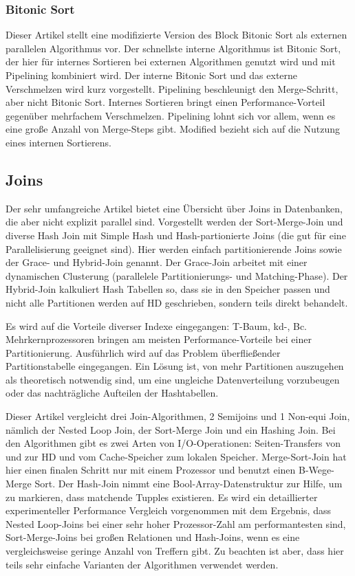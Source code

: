\documentclass[a4paper,12pt,twoside]{article}
\begin{document}
\subsubsection{Bitonic Sort}
\textbf{}

Dieser Artikel stellt eine modifizierte Version des Block Bitonic Sort als externen parallelen Algorithmus vor. Der schnellste interne Algorithmus ist Bitonic Sort, der hier für internes Sortieren bei externen Algorithmen genutzt wird und mit Pipelining kombiniert wird. Der interne Bitonic Sort und das externe Verschmelzen wird kurz vorgestellt. Pipelining beschleunigt den Merge-Schritt, aber nicht Bitonic Sort. Internes Sortieren bringt einen Performance-Vorteil gegenüber mehrfachem Verschmelzen. Pipelining lohnt sich vor allem, wenn es eine große Anzahl von Merge-Steps gibt. Modified bezieht sich auf die Nutzung eines internen Sortierens. 

\subsection{Joins}
\textbf{}

Der sehr umfangreiche Artikel bietet eine Übersicht über Joins in Datenbanken, die aber nicht explizit parallel sind. Vorgestellt werden der Sort-Merge-Join und diverse Hash Join mit Simple Hash und Hash-partionierte Joins (die gut für eine Parallelisierung geeignet sind). Hier werden einfach partitionierende Joins sowie der Grace- und Hybrid-Join genannt. Der Grace-Join arbeitet mit einer dynamischen Clusterung (parallelele Partitionierungs- und Matching-Phase). Der Hybrid-Join kalkuliert Hash Tabellen so, dass sie in den Speicher passen und nicht alle Partitionen werden auf HD geschrieben, sondern teils direkt behandelt.

Es wird auf die Vorteile diverser Indexe eingegangen: T-Baum, kd-, Bc. Mehrkernprozessoren bringen am meisten Performance-Vorteile bei einer Partitionierung. Ausführlich wird auf das Problem überfließender Partitionstabelle eingegangen. Ein Lösung ist, von mehr Partitionen auszugehen als theoretisch notwendig sind, um eine ungleiche Datenverteilung vorzubeugen oder das nachträgliche Aufteilen der Hashtabellen.

\textbf{}

Dieser Artikel vergleicht drei Join-Algorithmen, 2 Semijoins und 1 Non-equi Join, nämlich der Nested Loop Join, der Sort-Merge Join und ein Hashing Join. Bei den Algorithmen gibt es zwei Arten von I/O-Operationen: Seiten-Transfers von und zur HD und vom Cache-Speicher zum lokalen Speicher. Merge-Sort-Join hat hier einen finalen Schritt nur mit einem Prozessor und benutzt einen B-Wege-Merge Sort. Der Hash-Join nimmt eine Bool-Array-Datenstruktur zur Hilfe, um zu markieren, dass matchende Tupples existieren. Es wird ein detaillierter experimenteller Performance Vergleich vorgenommen mit dem Ergebnis, dass Nested Loop-Joins bei einer sehr hoher Prozessor-Zahl am performantesten sind, Sort-Merge-Joins bei großen Relationen und Hash-Joins, wenn es eine vergleichsweise geringe Anzahl von Treffern gibt. Zu beachten ist aber, dass hier teils sehr einfache Varianten der Algorithmen verwendet werden.
\end{document}
